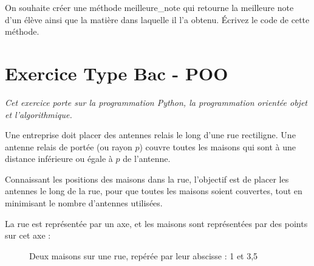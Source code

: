 \documentclass[a4paper, noanswers, addpoints, 12pt]{exam}
\begin{document}
\begin{questions}
\question[2] On souhaite créer une méthode meilleure\_note qui retourne la meilleure note d'un élève ainsi que la matière dans laquelle il l'a obtenu. Écrivez le code de cette méthode.

\section{Exercice Type Bac - POO}
\textit{Cet exercice porte sur la programmation Python, la programmation orientée objet et
l'algorithmique.}

Une entreprise doit placer des antennes relais le long d'une rue rectiligne. Une antenne relais de portée (ou rayon $p$) couvre toutes les maisons qui sont à une distance inférieure ou égale à $p$ de l'antenne.

Connaissant les positions des maisons dans la rue, l'objectif est de placer les antennes le long de la rue, pour que toutes les maisons soient couvertes, tout en minimisant le nombre d'antennes utilisées.

La rue est représentée par un axe, et les maisons sont représentées par des points sur cet axe :

\begin{figure}[h]
    \centering
    
    \caption{Deux maisons sur une rue, repérée par leur abscisse : 1 et 3,5}
    \label{fig:exemple}
\end{figure}


\end{questions}
\end{document}
